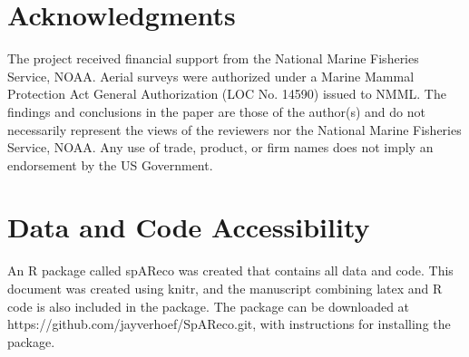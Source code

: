 \documentclass[11pt, titlepage]{article}\usepackage[]{graphicx}\usepackage[]{color}
\begin{document}
\section*{Acknowledgments} 

The project received financial support from the National Marine Fisheries Service, NOAA. Aerial surveys were authorized under a Marine Mammal Protection Act General Authorization (LOC No. 14590) issued to NMML. The findings and conclusions in the paper are those of the author(s) and do not necessarily represent the views of the reviewers nor the National Marine Fisheries Service, NOAA. Any use of trade, product, or firm names does not imply an endorsement by the US Government. 

\section*{Data and Code Accessibility}

An R package called spAReco was created that contains all data and code. This document was created using knitr, and the manuscript combining latex and R code is also included in the package.  The package can be downloaded at https://github.com/jayverhoef/SpAReco.git, with instructions for installing the package.


%





\newpage

\end{document}
